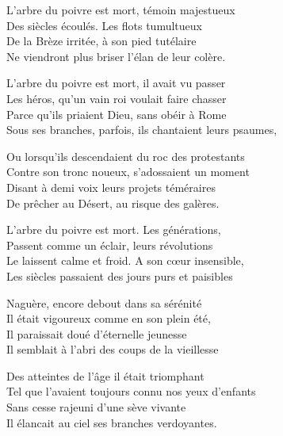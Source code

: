 \begin{center}
\begin{minipage}{0.55\textwidth}
L’arbre du poivre est mort, témoin majestueux\\
Des siècles écoulés. Les flots tumultueux\\
De la Brèze irritée, à son pied tutélaire\\
Ne viendront plus briser l’élan de leur colère.

\vspace{0.35cm}

L’arbre du poivre est mort, il avait vu passer\\
Les héros, qu’un vain roi voulait faire chasser\\
Parce qu’ils priaient Dieu, sans obéir à Rome\\
Sous ses branches, parfois, ils chantaient leurs psaumes,

\vspace{0.35cm}

Ou lorsqu’ils descendaient du roc des protestants\\
Contre son tronc noueux, s’adossaient un moment\\
Disant à demi voix leurs projets téméraires\\
De prêcher au Désert, au risque des galères.

\vspace{0.35cm}

L’arbre du poivre est mort. Les générations,\\
Passent comme un éclair, leurs révolutions\\
Le laissent calme et froid. A son cœur insensible,\\
Les siècles passaient des jours purs et paisibles

\vspace{0.35cm}

Naguère, encore debout dans sa sérénité\\
Il était vigoureux comme en son plein été,\\
Il paraissait doué d’éternelle jeunesse\\
Il semblait à l’abri des coups de la vieillesse

\vspace{0.35cm}

Des atteintes de l’âge il était triomphant\\
Tel que l’avaient toujours connu nos yeux d’enfants\\
Sans cesse rajeuni d’une sève vivante\\
Il élancait au ciel ses branches verdoyantes.
\end{minipage}
\end{center}

